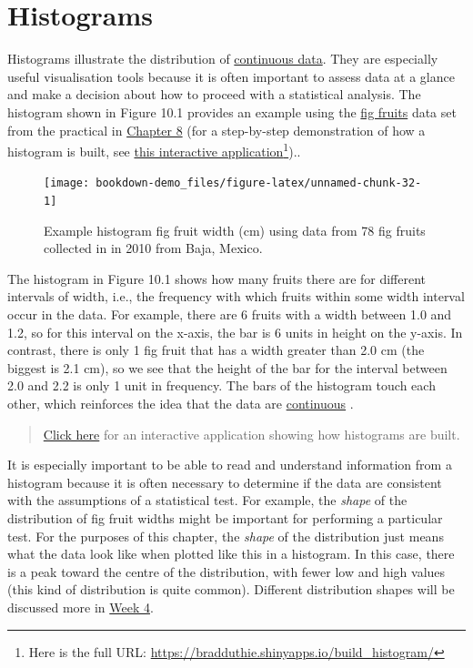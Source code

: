 \documentclass[
]{scrbook}
\begin{document}
\hypertarget{histograms}{%
\section{Histograms}\label{histograms}}

Histograms illustrate the distribution of \protect\hyperlink{Chapter_5}{continuous data}.
They are especially useful visualisation tools because it is often important to assess data at a glance and make a decision about how to proceed with a statistical analysis.
The histogram shown in Figure 10.1 provides an example using the \href{https://raw.githubusercontent.com/bradduthie/statistical_techniques/main/data/fig_fruits.csv}{fig fruits} data set from the practical in \protect\hyperlink{Chapter_8}{Chapter 8} (for a step-by-step demonstration of how a histogram is built, see \href{https://bradduthie.shinyapps.io/build_histogram/}{this interactive application}\footnote{Here is the full URL: \url{https://bradduthie.shinyapps.io/build_histogram/}})..

\begin{figure}
\texttt{[image: bookdown-demo\_files/figure-latex/unnamed-chunk-32-1]} \caption{Example histogram fig fruit width (cm) using data from 78 fig fruits collected in in 2010 from Baja, Mexico.}\label{fig:unnamed-chunk-32}
\end{figure}

The histogram in Figure 10.1 shows how many fruits there are for different intervals of width, i.e., the frequency with which fruits within some width interval occur in the data.
For example, there are 6 fruits with a width between 1.0 and 1.2, so for this interval on the x-axis, the bar is 6 units in height on the y-axis.
In contrast, there is only 1 fig fruit that has a width greater than 2.0 cm (the biggest is 2.1 cm), so we see that the height of the bar for the interval between 2.0 and 2.2 is only 1 unit in frequency.
The bars of the histogram touch each other, which reinforces the idea that the data are \protect\hyperlink{Chapter_5}{continuous} \citep{Dytham2011, Sokal1995}.

\begin{quote}
\href{https://bradduthie.shinyapps.io/build_histogram/}{Click here} for an interactive application showing how histograms are built.
\end{quote}

It is especially important to be able to read and understand information from a histogram because it is often necessary to determine if the data are consistent with the assumptions of a statistical test.
For example, the \emph{shape} of the distribution of fig fruit widths might be important for performing a particular test.
For the purposes of this chapter, the \emph{shape} of the distribution just means what the data look like when plotted like this in a histogram.
In this case, there is a peak toward the centre of the distribution, with fewer low and high values (this kind of distribution is quite common).
Different distribution shapes will be discussed more in \protect\hyperlink{Week4}{Week 4}.
\end{document}
